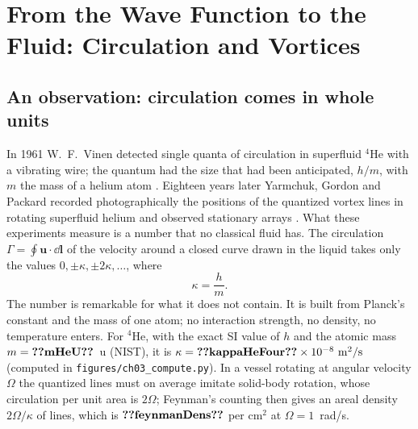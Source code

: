 \chapter{From the Wave Function to the Fluid: Circulation and Vortices}\label{ch03}
\newcommand{\cthreeNum}[1]{\ifcsname cthree@#1\endcsname\csname cthree@#1\endcsname\else\textbf{??#1??}\PackageWarning{ch03}{number #1 is undefined}\fi}
\newcommand{\cthreeCode}[1]{\path{#1}}
\newlength{\cthreeOldES}\setlength{\cthreeOldES}{\emergencystretch}\setlength{\emergencystretch}{2.5em}
\let\cthreeOldTopFrac\topfraction\let\cthreeOldTextFrac\textfraction\let\cthreeOldFloatFrac\floatpagefraction
\renewcommand{\topfraction}{0.9}\renewcommand{\textfraction}{0.1}\renewcommand{\floatpagefraction}{0.85}%

\section{An observation: circulation comes in whole units}\label{ch03:obs}

In 1961 W.~F.~Vinen detected single quanta of circulation in superfluid $^4$He with a vibrating wire; the quantum had the size that had been anticipated, $h/m$, with $m$ the mass of a helium atom \cite{Vinen1961,Zieve2023}.
Eighteen years later Yarmchuk, Gordon and Packard recorded photographically the positions of the quantized vortex lines in rotating superfluid helium and observed stationary arrays \cite{Yarmchuk1979}.
What these experiments measure is a number that no classical fluid has. The circulation $\Gamma=\oint\mathbf u\cdot\dd\mathbf l$ of the velocity around a closed curve drawn in the liquid takes only the values $0,\pm\kappa,\pm2\kappa,\dots$, where
\begin{equation}\label{ch03:eq-kappa}
  \kappa=\frac{h}{m}.
\end{equation}
The number is remarkable for what it does not contain. It is built from Planck's constant and the mass of one atom; no interaction strength, no density, no temperature enters. For $^4$He, with the exact SI value of $h$ and the atomic mass $m=\cthreeNum{mHeU}$~u (NIST), it is $\kappa=\cthreeNum{kappaHeFour}\times10^{-8}\ \mathrm{m^2/s}$ (computed in \texttt{figures/ch03\_compute.py}). In a vessel rotating at angular velocity $\Omega$ the quantized lines must on average imitate solid-body rotation, whose circulation per unit area is $2\Omega$; Feynman's counting \cite{Feynman1955} then gives an areal density $2\Omega/\kappa$ of lines, which is $\cthreeNum{feynmanDens}$ per cm$^2$ at $\Omega=1$~rad/s.


